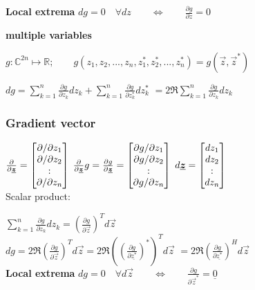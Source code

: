 \textbf{Local extrema}
$dg = 0 \quad \forall dz   \qquad \iff \qquad \frac{\partial g}{\partial z}=0$

\textbf{multiple variables}

$g:\mathbb{C}^{2n}\mapsto \mathbb{R}; \qquad g(z_1,z_2,...,z_n,z_1^*,z_2^*,...,z_n^*)=g(\vec{z},\vec{z}^*)$

$dg=\sum_{k=1}^{n} \frac{\partial g}{\partial z_k}dz_k+\sum_{k=1}^{n} \frac{\partial g}{\partial z_k^*}dz_k^* $
$=2\Re{\sum_{k=1}^{n}\frac{\partial g}{\partial z_k}dz_k}$



\subsubsection{Gradient vector}
$\frac{\partial}{\partial\underline{\boldsymbol {z}}}=\begin{bmatrix}\partial/\partial z_1 \\ \partial/\partial z_2 \\ : \\\partial/\partial z_n  \end{bmatrix} $ \qquad
$\frac{\partial}{\partial\underline{\boldsymbol {z}}}g=\frac{\partial g}{\partial\underline{\boldsymbol {z}}}=\begin{bmatrix}\partial g/\partial z_1 \\ \partial g/\partial z_2 \\ : \\\partial g/\partial z_n  \end{bmatrix} $
$d\underline{\boldsymbol {z}}=\begin{bmatrix}dz_1 \\ dz_2 \\ : \\ dz_n\end{bmatrix}$ \ \\

Scalar product:

$\sum\limits_{k=1}^n \frac{\partial g}{\partial z_k}dz_k=\left(\frac{\partial g}{\partial \vec{z}}\right)^Td\vec{z}$\ \\

$dg=2\Re{\left(\frac{\partial g}{\partial \vec{z}}\right)^Td\vec{z}}=2\Re{\left(\left(\frac{\partial g}{\partial \underline{z^*}}\right)^*\right)^Td\vec{z}}$
$=2\Re{\left(\frac{\partial g}{\partial \underline{z^*}}\right)^Hd\vec{z}}$\ \\

\textbf{Local extrema}
$dg = 0 \quad \forall d\vec{z}   \qquad \iff \qquad \frac{\partial g}{\partial \vec{z}^*}=\underline{0}$

